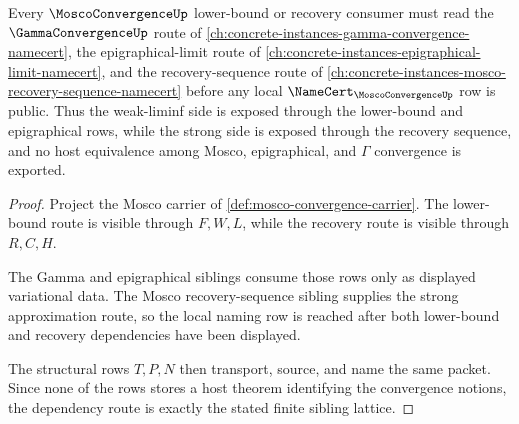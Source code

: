 \begin{theorem}
\label{thm:mosco-convergence-epigraphical-recovery-dependency-route}
Every $\MoscoConvergenceUp$ lower-bound or recovery consumer must read the $\GammaConvergenceUp$ route of \autoref{ch:concrete-instances-gamma-convergence-namecert}, the epigraphical-limit route of \autoref{ch:concrete-instances-epigraphical-limit-namecert}, and the recovery-sequence route of \autoref{ch:concrete-instances-mosco-recovery-sequence-namecert} before any local $\NameCert_{\MoscoConvergenceUp}$ row is public. Thus the weak-liminf side is exposed through the lower-bound and epigraphical rows, while the strong side is exposed through the recovery sequence, and no host equivalence among Mosco, epigraphical, and $\Gamma$ convergence is exported.
\end{theorem}
\begin{proof}
Project the Mosco carrier of \autoref{def:mosco-convergence-carrier}. The lower-bound route is visible through $F,W,L$, while the recovery route is visible through $R,C,H$.

The Gamma and epigraphical siblings consume those rows only as displayed variational data. The Mosco recovery-sequence sibling supplies the strong approximation route, so the local naming row is reached after both lower-bound and recovery dependencies have been displayed.

The structural rows $T,P,N$ then transport, source, and name the same packet. Since none of the rows stores a host theorem identifying the convergence notions, the dependency route is exactly the stated finite sibling lattice.
\end{proof}

